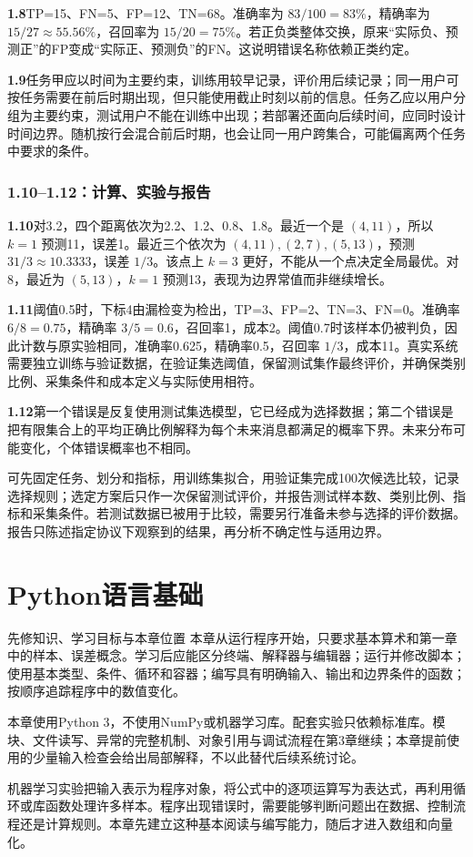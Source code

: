 \documentclass[UTF8,fontset=none,zihao=-4,a4paper]{ctexart}
\newcommand{\chapterpage}[1]{\clearpage\section{#1}}
\numberwithin{equation}{section}
\numberwithin{figure}{section}
\begin{document}
\textbf{1.8}\quad TP=15、FN=5、FP=12、TN=68。准确率为 $83/100=83\%$，精确率为 $15/27\approx55.56\%$，召回率为 $15/20=75\%$。若正负类整体交换，原来“实际负、预测正”的FP变成“实际正、预测负”的FN。这说明错误名称依赖正类约定。

\textbf{1.9}\quad 任务甲应以时间为主要约束，训练用较早记录，评价用后续记录；同一用户可按任务需要在前后时期出现，但只能使用截止时刻以前的信息。任务乙应以用户分组为主要约束，测试用户不能在训练中出现；若部署还面向后续时间，应同时设计时间边界。随机按行会混合前后时期，也会让同一用户跨集合，可能偏离两个任务中要求的条件。

\subsubsection*{1.10--1.12：计算、实验与报告}
\textbf{1.10}\quad 对3.2，四个距离依次为2.2、1.2、0.8、1.8。最近一个是 $(4,11)$，所以 $k=1$ 预测11，误差1。最近三个依次为 $(4,11),(2,7),(5,13)$，预测 $31/3\approx10.3333$，误差 $1/3$。该点上 $k=3$ 更好，不能从一个点决定全局最优。对8，最近为 $(5,13)$，$k=1$ 预测13，表现为边界常值而非继续增长。

\textbf{1.11}\quad 阈值0.5时，下标4由漏检变为检出，TP=3、FP=2、TN=3、FN=0。准确率 $6/8=0.75$，精确率 $3/5=0.6$，召回率1，成本2。阈值0.7时该样本仍被判负，因此计数与原实验相同，准确率0.625，精确率0.5，召回率 $1/3$，成本11。真实系统需要独立训练与验证数据，在验证集选阈值，保留测试集作最终评价，并确保类别比例、采集条件和成本定义与实际使用相符。

\textbf{1.12}\quad 第一个错误是反复使用测试集选模型，它已经成为选择数据；第二个错误是把有限集合上的平均正确比例解释为每个未来消息都满足的概率下界。未来分布可能变化，个体错误概率也不相同。

可先固定任务、划分和指标，用训练集拟合，用验证集完成100次候选比较，记录选择规则；选定方案后只作一次保留测试评价，并报告测试样本数、类别比例、指标和采集条件。若测试数据已被用于比较，需要另行准备未参与选择的评价数据。报告只陈述指定协议下观察到的结果，再分析不确定性与适用边界。

\chapterpage{Python语言基础}\label{ch:python}
\begin{infobox}{先修知识、学习目标与本章位置}
本章从运行程序开始，只要求基本算术和第一章中的样本、误差概念。学习后应能区分终端、解释器与编辑器；运行并修改脚本；使用基本类型、条件、循环和容器；编写具有明确输入、输出和边界条件的函数；按顺序追踪程序中的数值变化。

本章使用Python 3，不使用NumPy或机器学习库。配套实验只依赖标准库。模块、文件读写、异常的完整机制、对象引用与调试流程在第3章继续；本章提前使用的少量输入检查会给出局部解释，不以此替代后续系统讨论。
\end{infobox}
机器学习实验把输入表示为程序对象，将公式中的逐项运算写为表达式，再利用循环或库函数处理许多样本。程序出现错误时，需要能够判断问题出在数据、控制流程还是计算规则。本章先建立这种基本阅读与编写能力，随后才进入数组和向量化。
\end{document}

